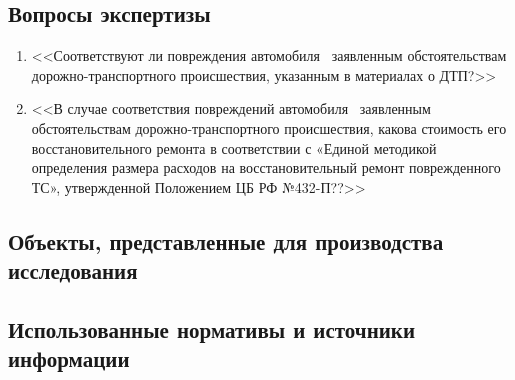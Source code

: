 \setcounter{page}{1}

%
%


\subsection{Вопросы экспертизы}
\begin{enumerate}\item  <<Соответствуют ли повреждения автомобиля  \,  заявленным обстоятельствам дорожно-транспортного происшествия, указанным в материалах о ДТП?>>	
\item  <<В случае соответствия повреждений  автомобиля  \,  заявленным обстоятельствам дорожно-транспортного происшествия, какова стоимость его восстановительного ремонта в соответствии с «Единой методикой определения размера расходов на восстановительный ремонт поврежденного ТС», утвержденной Положением ЦБ РФ №432-П??>> 
%	
\end{enumerate}
\subsection{Объекты, представленные для производства исследования} %
%

%
\subsection{Использованные нормативы и источники информации}
%

%

